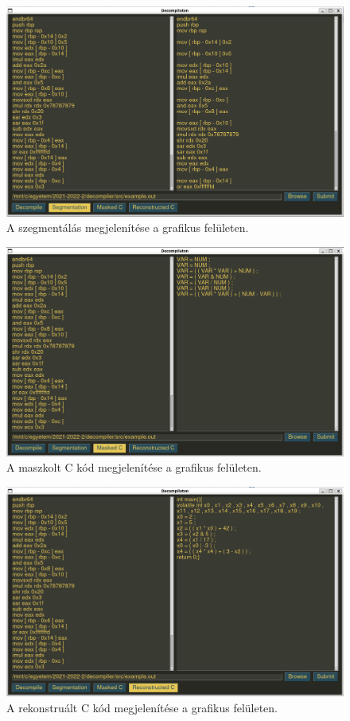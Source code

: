 \begin{figure}[H]
	\centering
	\includegraphics[width=1.0\textwidth]{images/segmentation.png}
	\caption{A szegmentálás megjelenítése a grafikus felületen.}
	\label{fig:segmentation}
\end{figure}

\begin{figure}[H]
	\centering
	\includegraphics[width=1.0\textwidth]{images/masked_c.png}
	\caption{A maszkolt C kód megjelenítése a grafikus felületen.}
	\label{fig:masked_c}
\end{figure}

\begin{figure}[H]
	\centering
	\includegraphics[width=1.0\textwidth]{images/reconstructed_c.png}
	\caption{A rekonstruált C kód megjelenítése a grafikus felületen.}
	\label{fig:reconstructed_c}
\end{figure}

